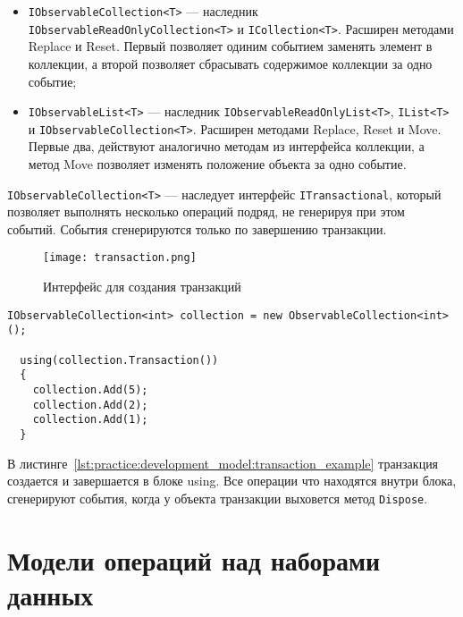 \begin{itemize}
  \item \lstinline[style=csharpinlinestyle]!IObservableCollection<T>! --- наследник \lstinline[style=csharpinlinestyle]!IObservableReadOnlyCollection<T>! и \lstinline[style=csharpinlinestyle]!ICollection<T>!.
  Расширен методами Replace и Reset. Первый позволяет одиним событием заменять элемент в коллекции, а второй позволяет сбрасывать содержимое коллекции за одно событие;
  \item \lstinline[style=csharpinlinestyle]!IObservableList<T>! --- наследник \lstinline[style=csharpinlinestyle]!IObservableReadOnlyList<T>!, \lstinline[style=csharpinlinestyle]!IList<T>! и \lstinline[style=csharpinlinestyle]!IObservableCollection<T>!.
  Расширен методами Replace, Reset и Move. Первые два, действуют аналогично методам из интерфейса коллекции, а метод Move позволяет изменять положение объекта за одно событие.
\end{itemize}

\lstinline[style=csharpinlinestyle]!IObservableCollection<T>! --- наследует интерфейс \lstinline[style=csharpinlinestyle]!ITransactional!, который позволяет выполнять несколько операций подряд, не генерируя при этом событий.
События сгенерируются только по завершению транзакции.

\begin{figure}[ht]
\centering
  \texttt{[image: transaction.png]}
  \caption{ Интерфейс для создания транзакций }
  \label{fig:transaction}
\end{figure}

\begin{lstlisting}[style=csharpinlinestyle, caption={Использование транзакции}, label=lst:practice:development_model:transaction_example]
  IObservableCollection<int> collection = new ObservableCollection<int>();

  using(collection.Transaction())
  {
    collection.Add(5);
    collection.Add(2);
    collection.Add(1);
  }
\end{lstlisting}

В листинге~\ref{lst:practice:development_model:transaction_example} транзакция создается и завершается в блоке using.
Все операции что находятся внутри блока, сгенерируют события, когда у объекта транзакции выховется метод \lstinline[style=csharpinlinestyle]!Dispose!.

\section{Модели операций над наборами данных}
\label{sub:research:operational_model}

